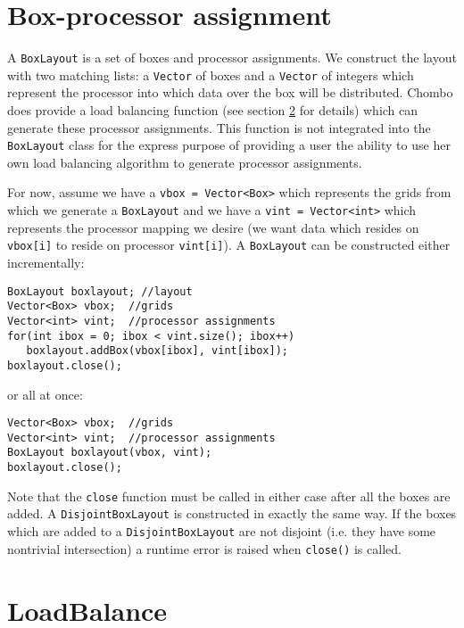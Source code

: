 \section{Box-processor assignment}
\label{AssignmentSection}

A {\tt BoxLayout} is a set of boxes and processor 
assignments.  We construct the layout with two matching lists:
a {\tt Vector} of boxes and 
a {\tt Vector} of integers which represent the processor 
into which data over the box will be distributed.  
Chombo does provide a  load balancing function 
(see section \ref{LoadBalanceSection} for details)
which can generate these processor assignments.
This function is not integrated into the {\tt BoxLayout}
class for the express purpose of providing a user
the ability to use her own load balancing algorithm
to generate processor assignments.  

For now, assume we have a \verb/vbox = Vector<Box>/ which 
represents the grids from  which we generate a 
{\tt BoxLayout} and we have a \verb/vint = Vector<int>/
which represents the processor mapping we desire
(we want data which resides on \verb/vbox[i]/ to reside
on processor \verb/vint[i]/).  A {\tt BoxLayout} can
be constructed either incrementally:
\small \begin{verbatim}
BoxLayout boxlayout; //layout
Vector<Box> vbox;  //grids
Vector<int> vint;  //processor assignments
for(int ibox = 0; ibox < vint.size(); ibox++)
   boxlayout.addBox(vbox[ibox], vint[ibox]);
boxlayout.close();
\end{verbatim} \normalsize
or all at once:
\small \begin{verbatim}
Vector<Box> vbox;  //grids
Vector<int> vint;  //processor assignments
BoxLayout boxlayout(vbox, vint);
boxlayout.close();
\end{verbatim} \normalsize
Note that the {\tt close} function must
be called in either case 
after all the boxes are added.   A {\tt DisjointBoxLayout}
is constructed in exactly the same way.  If the boxes
which are added to a {\tt DisjointBoxLayout} are not
disjoint (i.e. they have some nontrivial intersection)
a runtime error is raised when {\tt close()} is called.

\section{LoadBalance}
\label{LoadBalanceSection}


